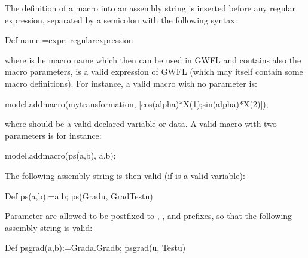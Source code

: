 \documentclass[a4paper,11pt,english]{sphinxmanual}
\begin{document}
The definition of a macro into an assembly string is inserted before any regular expression, separated by a semicolon with the following syntax:

\begin{sphinxVerbatim}[commandchars=\\\{\}]
\PYGZdq{}Def name:=expr; regular\PYGZus{}expression\PYGZdq{}
\end{sphinxVerbatim}

where  is he macro name which then can be used in GWFL and contains also the macro parameters,  is a valid expression of GWFL (which may itself contain some macro definitions). For instance, a valid macro with no parameter is:

\begin{sphinxVerbatim}[commandchars=\\\{\}]
model.add\PYGZus{}macro(\PYGZdq{}my\PYGZus{}transformation\PYGZdq{}, \PYGZdq{}[cos(alpha)*X(1);sin(alpha)*X(2)]\PYGZdq{});
\end{sphinxVerbatim}

where  should be a valid declared variable or data. A valid macro with two parameters is for instance:

\begin{sphinxVerbatim}[commandchars=\\\{\}]
model.add\PYGZus{}macro(\PYGZdq{}ps(a,b)\PYGZdq{}, \PYGZdq{}a.b\PYGZdq{});
\end{sphinxVerbatim}

The following assembly string is then valid (if  is a valid variable):

\begin{sphinxVerbatim}[commandchars=\\\{\}]
\PYGZdq{}Def ps(a,b):=a.b; ps(Grad\PYGZus{}u, Grad\PYGZus{}Test\PYGZus{}u)\PYGZdq{}
\end{sphinxVerbatim}

Parameter are allowed to be post\sphinxhyphen{}fixed to , ,  and  prefixes, so that the following assembly string is valid:

\begin{sphinxVerbatim}[commandchars=\\\{\}]
\PYGZdq{}Def psgrad(a,b):=Grad\PYGZus{}a.Grad\PYGZus{}b; psgrad(u, Test\PYGZus{}u)\PYGZdq{}
\end{sphinxVerbatim}
\end{document}
